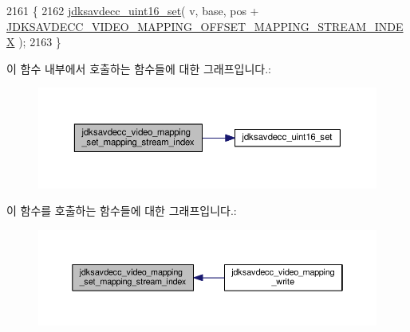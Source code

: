 \begin{DoxyCode}
2161 \{
2162     \hyperlink{group__endian_ga14b9eeadc05f94334096c127c955a60b}{jdksavdecc\_uint16\_set}( v, base, pos + 
      \hyperlink{group__video__mapping_ga8a438dda99ec8e3b7e5b6aea779b5f36}{JDKSAVDECC\_VIDEO\_MAPPING\_OFFSET\_MAPPING\_STREAM\_INDEX} );
2163 \}
\end{DoxyCode}


이 함수 내부에서 호출하는 함수들에 대한 그래프입니다.\+:
\nopagebreak
\begin{figure}[H]
\begin{center}
\leavevmode
\includegraphics[width=350pt]{group__video__mapping_ga00c997fcbc630af09b5c8dbb5eac39ee_cgraph}
\end{center}
\end{figure}




이 함수를 호출하는 함수들에 대한 그래프입니다.\+:
\nopagebreak
\begin{figure}[H]
\begin{center}
\leavevmode
\includegraphics[width=350pt]{group__video__mapping_ga00c997fcbc630af09b5c8dbb5eac39ee_icgraph}
\end{center}
\end{figure}


